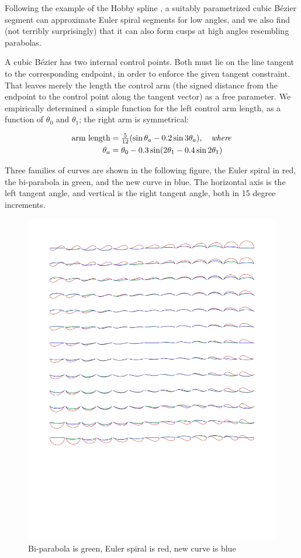 \documentclass{article}
\begin{document}
Following the example of the Hobby spline \cite{Hobby85}, a suitably parametrized cubic B{\'e}zier segment can approximate Euler spiral segments for low angles, and we also find (not terribly surprisingly) that it can also form cusps at high angles resembling parabolas.

A cubic B{\'e}zier has two internal control points. Both must lie on the line tangent to the corresponding endpoint, in order to enforce the given tangent constraint. That leaves merely the length the control arm (the signed distance from the endpoint to the control point along the tangent vector) as a free parameter. We empirically determined a simple function for the left control arm length, as a function of $\theta_0$ and $\theta_1$; the right arm is symmetrical:

\[
\begin{aligned}
\mbox{arm length} & = \tfrac{5}{12}(\sin \theta_a - 0.2\sin 3\theta_a), \quad \mbox{\emph{where}} \\
\theta_a & = \theta_0 - 0.3 \sin (2\theta_1 - 0.4\sin 2\theta_1) \\
\end{aligned}
\]

Three families of curves are shown in the following figure, the Euler spiral in red, the bi-parabola in green, and the new curve in blue. The horizontal axis is the left tangent angle, and vertical is the right tangent angle, both in 15 degree increments.

\begin{figure}
\includegraphics[scale=0.7]{biparab_euler_mycurve}
\caption{Bi-parabola is green, Euler spiral is red, new curve is blue}
\end{figure}
\end{document}
